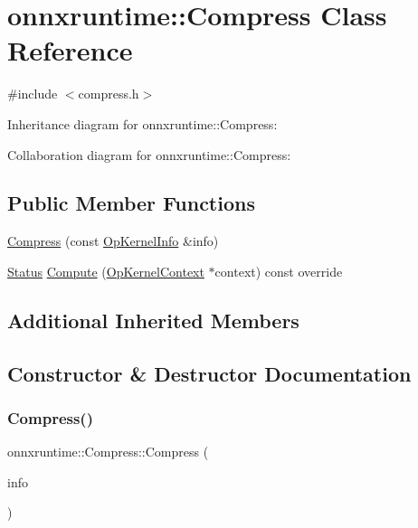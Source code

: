\hypertarget{classonnxruntime_1_1Compress}{}\section{onnxruntime\+:\+:Compress Class Reference}
\label{classonnxruntime_1_1Compress}


{\ttfamily \#include $<$compress.\+h$>$}



Inheritance diagram for onnxruntime\+:\+:Compress\+:


Collaboration diagram for onnxruntime\+:\+:Compress\+:
\subsection*{Public Member Functions}
\begin{DoxyCompactItemize}
\item 
\mbox{\hyperlink{classonnxruntime_1_1Compress_a13e3324e5e8b452e1ec7b699f458c9eb}{Compress}} (const \mbox{\hyperlink{classonnxruntime_1_1OpKernelInfo}{Op\+Kernel\+Info}} \&info)
\item 
\mbox{\hyperlink{classonnxruntime_1_1common_1_1Status}{Status}} \mbox{\hyperlink{classonnxruntime_1_1Compress_a3fb89293bd5c713c2ec5b76a19d2c183}{Compute}} (\mbox{\hyperlink{classonnxruntime_1_1OpKernelContext}{Op\+Kernel\+Context}} $\ast$context) const override
\end{DoxyCompactItemize}
\subsection*{Additional Inherited Members}


\subsection{Constructor \& Destructor Documentation}
\mbox{\label{classonnxruntime_1_1Compress_a13e3324e5e8b452e1ec7b699f458c9eb}} 
\subsubsection{\texorpdfstring{Compress()}{Compress()}}
{\footnotesize\ttfamily onnxruntime\+::\+Compress\+::\+Compress (\begin{DoxyParamCaption}\item[{const \mbox{\hyperlink{classonnxruntime_1_1OpKernelInfo}{Op\+Kernel\+Info}} \&}]{info }\end{DoxyParamCaption})\hspace{0.3cm}{\ttfamily [inline]}}



